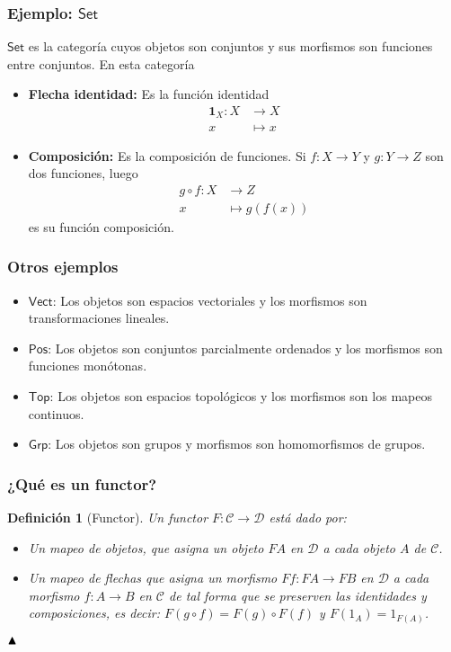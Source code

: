 \documentclass[10pt, aspectratio = 43,usenames,dvipsnames]{beamer}
\newtheorem{definicion}{Definición}
\begin{document}
	\begin{frame}[t]
		\frametitle{Ejemplo: $\mathsf{Set}$}
			$\mathsf{Set}$ es la categoría cuyos objetos son conjuntos y sus morfismos son funciones entre conjuntos. En esta categoría
			\begin{itemize}
				\item \textbf{Flecha identidad:} Es la función identidad
				\begin{align*}
					 \mathbf{1}_{X}: X&\to X\\
					 x&\mapsto x
				\end{align*}
				\item \textbf{Composición:} Es la composición de funciones. Si $f:X\to Y$ y $g: Y\to Z$ son dos funciones, luego
				\begin{align*}
					g\circ f: X&\to Z\\
					x&\mapsto g(f(x))
				\end{align*}
				es su función composición.
			\end{itemize}
	\end{frame}
	
	
	\begin{frame}[t]
		\frametitle{Otros ejemplos}
		\begin{itemize}
			\item $\mathsf{Vect}$: Los objetos son espacios vectoriales y los morfismos son transformaciones lineales.
			\item $\mathsf{Pos}$: Los objetos son conjuntos parcialmente ordenados y los morfismos son funciones monótonas.
			\item $\mathsf{Top}$: Los objetos son espacios topológicos y los morfismos son los mapeos continuos.
			\item $\mathsf{Grp}$: Los objetos son grupos y morfismos son homomorfismos de grupos.
		\end{itemize}
	\end{frame}
	
	\begin{frame}[t]
		\frametitle{¿Qué es un functor?}
		\begin{definicion}[Functor]
			Un functor $F: \mathcal{C}\to\mathcal{D}$ está dado por:
			\begin{itemize}
				\item Un mapeo de objetos, que asigna un objeto $FA$ en $\mathcal{D}$ a cada objeto $A$ de $\mathcal{C}$.
				\item Un mapeo de flechas que asigna un morfismo $Ff:FA\to FB$ en $\mathcal{D}$ a cada morfismo $f:A\to B$ en $\mathcal{C}$ de tal forma que se preserven las identidades y composiciones, es decir: $F(g\circ f) = F(g)\circ F(f)$ y $F(1_{A}) = 1_{F(A)}$.	
			\end{itemize}
		$\hfill\blacktriangle$
		\end{definicion}
	\end{frame}
	
\end{document}
